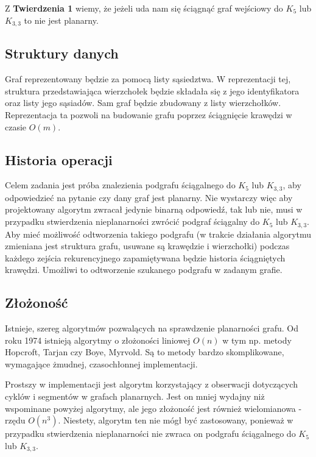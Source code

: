 \documentclass[a4 122pt]{article}
\begin{document}
		Z \textbf{Twierdzenia 1} wiemy, że jeżeli uda nam się ściągnąć graf wejściowy do $K_5$ lub $K_{3,3}$ to nie jest planarny. 
	
	\subsection{Struktury danych}

		Graf reprezentowany będzie za pomocą listy sąsiedztwa. 
		W reprezentacji tej, struktura przedstawiająca wierzchołek będzie składała się z jego identyfikatora oraz listy jego sąsiadów. 
		Sam graf będzie zbudowany z listy wierzchołków. 
		Reprezentacja ta pozwoli na budowanie grafu poprzez ściągnięcie krawędzi w czasie $O(m)$.
	
	\subsection{Historia operacji}
		Celem zadania jest próba znalezienia podgrafu ściągalnego do $K_5$ lub $K_{3,3}$, aby odpowiedzieć na pytanie czy dany graf jest planarny. 
		Nie wystarczy więc aby projektowany algorytm zwracał jedynie binarną odpowiedź, tak lub nie, musi w przypadku stwierdzenia nieplanarności zwrócić podgraf ściągalny do $K_5$ lub $K_{3,3}$.
		Aby mieć możliwość odtworzenia takiego podgrafu (w trakcie działania algorytmu zmieniana jest struktura grafu, usuwane są krawędzie i wierzchołki) podczas każdego zejścia rekurencyjnego zapamiętywana będzie historia ściągniętych krawędzi. 
		Umożliwi to odtworzenie szukanego podgrafu w zadanym grafie.
	
	\subsection{Złożoność}
	
		Istnieje, szereg algorytmów pozwalących na sprawdzenie planarności grafu.
		Od roku 1974 istnieją algorytmy o złożoności liniowej $O(n)$ w tym np. metody Hopcroft, Tarjan czy Boye, Myrvold.
		Są to metody bardzo skomplikowane, wymagające żmudnej, czasochłonnej implementacji.
		
		Prostszy w implementacji jest algorytm korzystający z obserwacji dotyczących cyklów i segmentów w grafach planarnych. 
		Jest on mniej wydajny niż wspominane powyżej algorytmy, ale jego złożoność jest również wielomianowa - rzędu $O(n^3)$. 
		Niestety, algorytm ten nie mógł być zastosowany, ponieważ w przypadku stwierdzenia nieplanarności nie zwraca on podgrafu ściągalnego do $K_5$ lub $K_{3, 3}$.
		
\end{document}
